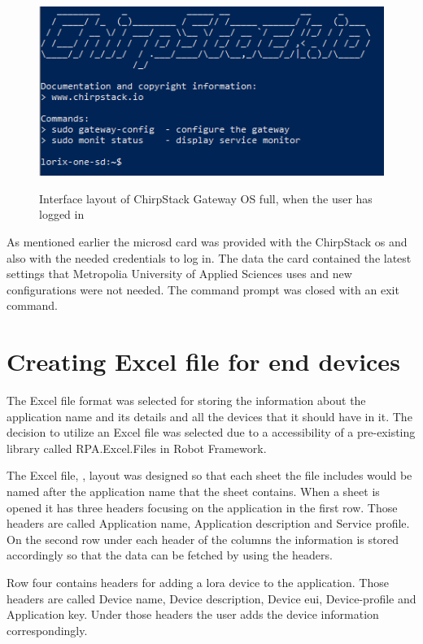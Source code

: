 \begin{figure}[ht]
  \centering
  {\includegraphics[width=\textwidth]{illustration/chirpstack_io_main_screen.PNG}}
  \caption{Interface layout of ChirpStack Gateway OS full, when the user has logged in}
  \label{fig:ChirpStack_gateway_os}
\end{figure}

As mentioned earlier the micro\gls{sd} card was provided with the ChirpStack \gls{os} and also with the needed credentials to log in.
The data the card contained the latest settings that Metropolia University of Applied Sciences uses and new configurations were not needed.
The command prompt was closed with an exit command.

\section{Creating Excel file for end devices}
The Excel file format was selected for storing the information about the application name and its details and all the devices that it should have in it.
The decision to utilize an Excel file was selected due to a accessibility of a pre-existing library called RPA.Excel.Files in Robot Framework.

\clearpage

The Excel file, , layout was designed so that each sheet the file includes would be named after the application name that the sheet contains.
When a sheet is opened it has three headers focusing on the application in the first row.
Those headers are called Application name, Application description and Service profile.
On the second row under each header of the columns the information is stored accordingly so that the data can be fetched by using the headers.

Row four contains headers for adding a \gls{lora} device to the application.
Those headers are called Device name, Device description, Device \gls{eui}, Device-profile and Application key.
Under those headers the user adds the device information correspondingly.

